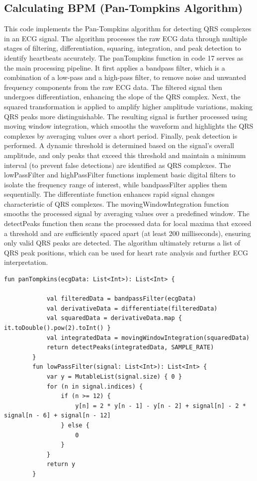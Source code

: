 {{	\subsection{Calculating BPM (Pan-Tompkins Algorithm)}
	This code implements the Pan-Tompkins algorithm for detecting QRS complexes in an ECG signal. The algorithm processes the raw ECG data through multiple stages of filtering, differentiation, squaring, integration, and peak detection to identify heartbeats accurately.
	The panTompkins function in code 17 serves as the main processing pipeline. It first applies a bandpass filter, which is a combination of a low-pass and a high-pass filter, to remove noise and unwanted frequency components from the raw ECG data. The filtered signal then undergoes differentiation, enhancing the slope of the QRS complex.
	Next, the squared transformation is applied to amplify higher amplitude variations, making QRS peaks more distinguishable. The resulting signal is further processed using moving window integration, which smooths the waveform and highlights the QRS complexes by averaging values over a short period.
	Finally, peak detection is performed. A dynamic threshold is determined based on the signal’s overall amplitude, and only peaks that exceed this threshold and maintain a minimum interval (to prevent false detections) are identified as QRS complexes.
	The lowPassFilter and highPassFilter functions implement basic digital filters to isolate the frequency range of interest, while bandpassFilter applies them sequentially. The differentiate function enhances rapid signal changes characteristic of QRS complexes. The movingWindowIntegration function smooths the processed signal by averaging values over a predefined window.
	The detectPeaks function then scans the processed data for local maxima that exceed a threshold and are sufficiently spaced apart (at least 200 milliseconds), ensuring only valid QRS peaks are detected. The algorithm ultimately returns a list of QRS peak positions, which can be used for heart rate analysis and further ECG interpretation. \cite{pingale2014ecg}
		\begin{lstlisting}[label={fig:simpleSourceGen.cs}, caption={Pan-Tompkins algorithm}]
		 fun panTompkins(ecgData: List<Int>): List<Int> {
		
			val filteredData = bandpassFilter(ecgData)
			val derivativeData = differentiate(filteredData)
			val squaredData = derivativeData.map { it.toDouble().pow(2).toInt() }
			val integratedData = movingWindowIntegration(squaredData)
			return detectPeaks(integratedData, SAMPLE_RATE)
		}
		fun lowPassFilter(signal: List<Int>): List<Int> {
			var y = MutableList(signal.size) { 0 }
			for (n in signal.indices) {
				if (n >= 12) {
					y[n] = 2 * y[n - 1] - y[n - 2] + signal[n] - 2 * signal[n - 6] + signal[n - 12]
				} else {
					0 
				}
			}
			return y
		}
		

\end{lstlisting}}}
